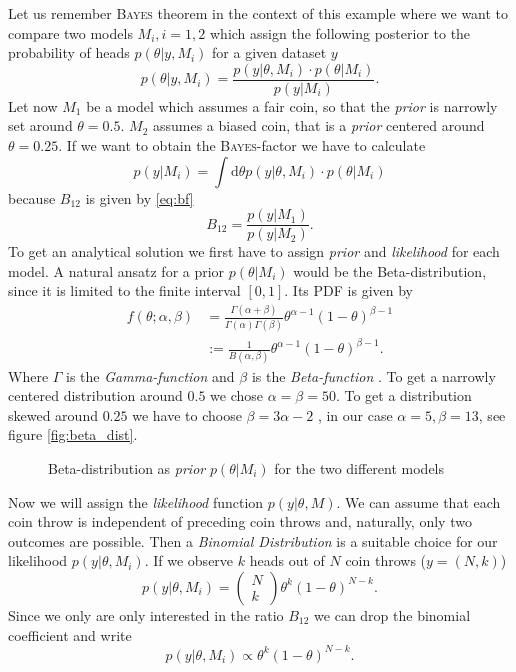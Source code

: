 \documentclass[%
 reprint,
 amsmath,amssymb,
 aps,
]{revtex4-1}
\begin{document}
Let us remember \textsc{Bayes} theorem in the context of this example where we want to compare two models $M_i,i=1,2$ which assign the following posterior to the probability of heads $p(\theta|y,M_i)$ for a given dataset $y$
$$p(\theta|y,M_i)=\frac{p(y|\theta,M_i)\cdot p(\theta|M_i)}{p(y|M_i)}.$$
Let now $M_1$ be a model which assumes a fair coin, so that the \emph{prior} is narrowly set around $\theta=0.5$. $M_2$ assumes a biased coin, that is a \emph{prior} centered around $\theta =0.25$. If we want to obtain the \textsc{Bayes}-factor we have to calculate $$p(y|M_i)=\int \text{d}\theta p(y|\theta,M_i)\cdot p(\theta|M_i) $$
because $B_{12}$ is given by \eqref{eq:bf} $$B_{12}=\frac{p(y|M_1)}{p(y|M_2)}.$$
To get an analytical solution we first have to assign \emph{prior} and \emph{likelihood} for each model. A natural ansatz for a prior $p(\theta|M_i)$ would be the Beta-distribution, since it is limited to the finite interval $[0,1]$. Its PDF is given by \cite{kormaz} \begin{align*}f(\theta;\alpha,\beta)&=\frac{\Gamma(\alpha+\beta)}{\Gamma(\alpha)\Gamma(\beta)}\theta^{\alpha-1}(1-\theta)^{\beta-1}\\&:=\frac{1}{B(\alpha,\beta)}\theta^{\alpha-1}(1-\theta)^{\beta-1}.
\end{align*}
Where $\Gamma$ is the \emph{Gamma-function} \cite{gamma_function} and $\beta$ is the \emph{Beta-function} \cite{beta_function}.
To get a narrowly centered distribution around $0.5$ we chose $\alpha=\beta=50$. To get a distribution skewed around $0.25$ we have to choose $\beta=3\alpha-2$ \cite{wiki}, in our case $\alpha=5,\beta=13$, see figure \eqref{fig:beta_dist}.
\begin{figure}
	\centering
	\caption{Beta-distribution as \emph{prior} $p(\theta|M_i)$ for the two different models}
	\label{fig:beta_dist}
\end{figure}
Now we will assign the \emph{likelihood} function $p(y|\theta,M)$. We can assume that each coin throw is independent of preceding coin throws and, naturally, only two outcomes are possible. Then a \emph{Binomial Distribution} is a suitable choice for our likelihood $p(y|\theta,M_i)$. If we observe $k$ heads out of $N$ coin throws ($y=(N,k)$) $$p(y|\theta,M_i)=\begin{pmatrix}N\\k
\end{pmatrix}\theta^k(1-\theta)^{N-k}.$$
Since we only are only interested in the ratio $B_{12}$ we can drop the binomial coefficient and write $$p(y|\theta, M_i)\propto \theta^k(1-\theta)^{N-k}.$$
\end{document}
